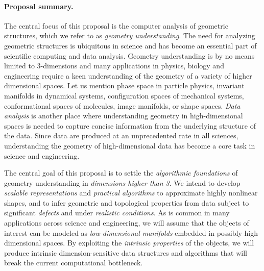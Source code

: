 

\paragraph{Proposal summary.} 
The central focus of this proposal is the computer analysis of
geometric structures, which we refer to as {\em geometry
  understanding}.  The need for analyzing geometric structures is
ubiquitous in science and has become an essential part of scientific
computing and data analysis. Geometry understanding is by no means
limited to 3-dimensions and many applications in physics, biology and
engineering require a keen understanding of the geometry of a variety
of higher dimensional spaces. Let us mention phase space in particle
physics, invariant manifolds in dynamical systems, configuration
spaces of mechanical systems, conformational spaces of molecules,
image manifolds, or shape spaces.
{\em Data analysis}  is another place where understanding
geometry in high-dimensional spaces is needed to
capture concise information from the underlying structure of the data.  
Since data are produced at an unprecedented rate in all
sciences, understanding the geometry of high-dimensional data %
has become a core task in science and engineering.

The central goal of this proposal is to settle the {\em algorithmic
foundations} of geometry understanding in {\em dimensions higher than
3}.  We intend to develop {\em scalable representations} and {\em
practical algorithms} to approximate highly nonlinear shapes, and to
infer geometric and topological properties from data subject to
significant {\em defects} and under {\em realistic conditions}.
As is common in many applications across science and engineering, we
will assume that the objects of interest can be modeled as {\em
  low-dimensional manifolds} embedded in possibly high-dimensional
spaces. By exploiting the {\em intrinsic properties} of the objects,
we will produce intrinsic dimension-sensitive data structures and algorithms
that will break the current computational
bottleneck.

